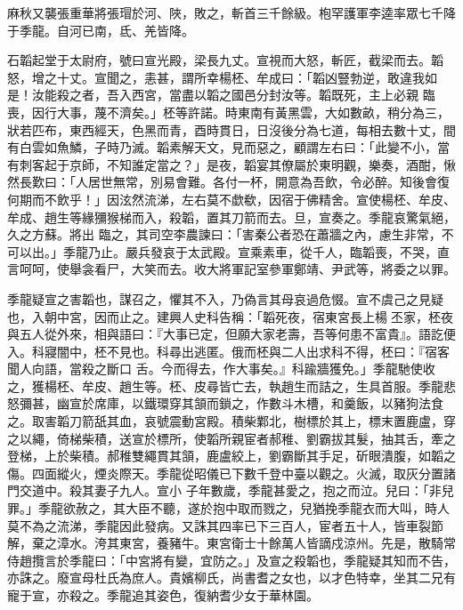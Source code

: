 \begin{pinyinscope}
 麻秋又襲張重華將張瑁於河、陜，敗之，斬首三千餘級。枹罕護軍李逵率眾七千降于季龍。自河已南，氐、羌皆降。



 石韜起堂于太尉府，號曰宣光殿，梁長九丈。宣視而大怒，斬匠，截梁而去。韜怒，增之十丈。宣聞之，恚甚，謂所幸楊柸、牟成曰：「韜凶豎勃逆，敢違我如是！汝能殺之者，吾入西宮，當盡以韜之國邑分封汝等。韜既死，主上必親
 臨喪，因行大事，蔑不濟矣。」柸等許諾。時東南有黃黑雲，大如數畝，稍分為三，狀若匹布，東西經天，色黑而青，酉時貫日，日沒後分為七道，每相去數十丈，間有白雲如魚鱗，子時乃滅。韜素解天文，見而惡之，顧謂左右曰：「此變不小，當有刺客起于京師，不知誰定當之？」是夜，韜宴其僚屬於東明觀，樂奏，酒酣，愀然長歎曰：「人居世無常，別易會難。各付一杯，開意為吾飲，令必醉。知後會復何期而不飲乎！」因泫然流涕，左右莫不歔欷，因宿于佛精舍。宣使楊柸、牟皮、牟成、趙生等緣獼猴梯而入，殺韜，置其刀箭而去。旦，宣奏之。季龍哀驚氣絕，久之方蘇。將出
 臨之，其司空李農諫曰：「害秦公者恐在蕭牆之內，慮生非常，不可以出。」季龍乃止。嚴兵發哀于太武殿。宣乘素車，從千人，臨韜喪，不哭，直言呵呵，使舉衾看尸，大笑而去。收大將軍記室參軍鄭靖、尹武等，將委之以罪。



 季龍疑宣之害韜也，謀召之，懼其不入，乃偽言其母哀過危惙。宣不虞己之見疑也，入朝中宮，因而止之。建興人史科告稱：「韜死夜，宿東宮長上楊丕家，柸夜與五人從外來，相與語曰：『大事已定，但願大家老壽，吾等何患不富貴』。語訖便入。科寢闇中，柸不見也。科尋出逃匿。俄而柸與二人出求科不得，柸曰：『宿客聞人向語，當殺之斷口
 舌。今而得去，作大事矣。』科踰牆獲免。」季龍馳使收之，獲楊柸、牟皮、趙生等。柸、皮尋皆亡去，執趙生而詰之，生具首服。季龍悲怒彌甚，幽宣於席庫，以鐵環穿其頷而鎖之，作數斗木槽，和羹飯，以豬狗法食之。取害韜刀箭舐其血，哀號震動宮殿。積柴鄴北，樹標於其上，標末置鹿盧，穿之以繩，倚梯柴積，送宣於標所，使韜所親宦者郝稚、劉霸拔其髮，抽其舌，牽之登梯，上於柴積。郝稚雙繩貫其頷，鹿盧絞上，劉霸斷其手足，斫眼潰腹，如韜之傷。四面縱火，煙炎際天。季龍從昭儀已下數千登中臺以觀之。火滅，取灰分置諸門交道中。殺其妻子九人。宣小
 子年數歲，季龍甚愛之，抱之而泣。兒曰：「非兒罪。」季龍欲赦之，其大臣不聽，遂於抱中取而戮之，兒猶挽季龍衣而大叫，時人莫不為之流涕，季龍因此發病。又誅其四率已下三百人，宦者五十人，皆車裂節解，棄之漳水。洿其東宮，養豬牛。東宮衛士十餘萬人皆謫戍涼州。先是，散騎常侍趙攬言於季龍曰：「中宮將有變，宜防之。」及宣之殺韜也，季龍疑其知而不告，亦誅之。廢宣母杜氏為庶人。貴嬪柳氏，尚書耆之女也，以才色特幸，坐其二兄有寵于宣，亦殺之。季龍追其姿色，復納耆少女于華林園。




\end{pinyinscope}
